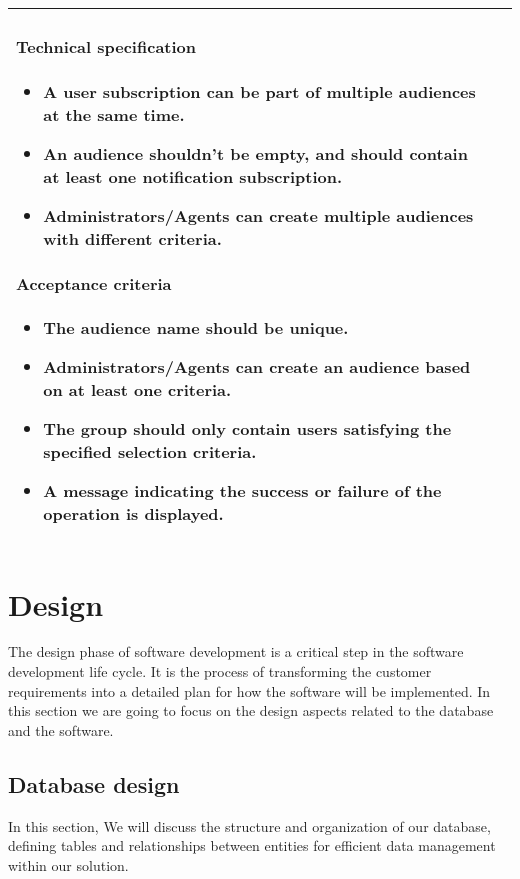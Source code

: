 \begin{longtable}{ | m{} | m{} | }
    \paragraph*{Technical specification} \mbox{} \newline
    \begin{itemize}
        \item A user subscription can be part of multiple audiences at the same time.
        \item An audience shouldn't be empty, and should contain at least one notification subscription.
        \item Administrators/Agents can create multiple audiences with different criteria.
    \end{itemize}
    \paragraph*{Acceptance criteria} \mbox{} \newline
    \begin{itemize}
        \item The audience name should be unique.
        \item Administrators/Agents can create an audience based on at least one criteria.
        \item The group should only contain users satisfying the specified selection criteria.
        \item A message indicating the success or failure of the operation is displayed.
    \end{itemize}                                                                                                                                                                                 \\
    \hline
\end{longtable}

\section{Design}
The design phase of software development is a critical step in the software development life cycle.
It is the process of transforming the customer requirements into a detailed plan for how the software
will be implemented. In this section we are going to focus on the design aspects related to the database
and the software.

\subsection{Database design}
In this section, We will discuss the structure and organization of our database, defining tables and relationships
between entities for efficient data management within our solution.

